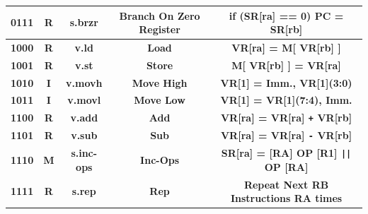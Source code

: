 \documentclass{article}
\begin{document}
\begin{table}[H]
\begin{tabular}{|c|*{4}{c|}}
        \multicolumn{1}{|c|}{\textbf{0111}}   & \multicolumn{1}{c|}{\textbf{R}}     & \multicolumn{1}{c|}{\textbf{s.brzr}}    & \multicolumn{1}{c|}{\textbf{Branch On Zero Register}} & \multicolumn{1}{c|}{\textbf{if (SR[ra] == 0) PC = SR[rb]}}              \\ \hline
        \multicolumn{1}{|c|}{\textbf{1000}}   & \multicolumn{1}{c|}{\textbf{R}}     & \multicolumn{1}{c|}{\textbf{v.ld}}      & \multicolumn{1}{c|}{\textbf{Load}}                    & \multicolumn{1}{c|}{\textbf{VR[ra] = M[ VR[rb] ]}}                      \\ \hline
        \multicolumn{1}{|c|}{\textbf{1001}}   & \multicolumn{1}{c|}{\textbf{R}}     & \multicolumn{1}{c|}{\textbf{v.st}}      & \multicolumn{1}{c|}{\textbf{Store}}                   & \multicolumn{1}{c|}{\textbf{M[ VR[rb] ] = VR[ra]}}                      \\ \hline
        \multicolumn{1}{|c|}{\textbf{1010}}   & \multicolumn{1}{c|}{\textbf{I}}     & \multicolumn{1}{c|}{\textbf{v.movh}}    & \multicolumn{1}{c|}{\textbf{Move High}}               & \multicolumn{1}{c|}{\textbf{VR[1] = {Imm., VR[1](3:0)}}}                \\ \hline
        \multicolumn{1}{|c|}{\textbf{1011}}   & \multicolumn{1}{c|}{\textbf{I}}     & \multicolumn{1}{c|}{\textbf{v.movl}}    & \multicolumn{1}{c|}{\textbf{Move Low}}                & \multicolumn{1}{c|}{\textbf{VR[1] = {VR[1](7:4), Imm.}}}                \\ \hline
        \multicolumn{1}{|c|}{\textbf{1100}}   & \multicolumn{1}{c|}{\textbf{R}}     & \multicolumn{1}{c|}{\textbf{v.add}}     & \multicolumn{1}{c|}{\textbf{Add}}                     & \multicolumn{1}{c|}{\textbf{VR[ra] = VR[ra] \texttt{+} VR[rb]}}         \\ \hline
        \multicolumn{1}{|c|}{\textbf{1101}}   & \multicolumn{1}{c|}{\textbf{R}}     & \multicolumn{1}{c|}{\textbf{v.sub}}     & \multicolumn{1}{c|}{\textbf{Sub}}                     & \multicolumn{1}{c|}{\textbf{VR[ra] = VR[ra] \texttt{-} VR[rb]}}         \\ \hline
        \multicolumn{1}{|c|}{\textbf{1110}}   & \multicolumn{1}{c|}{\textbf{M}}     & \multicolumn{1}{c|}{\textbf{s.inc-ops}} & \multicolumn{1}{c|}{\textbf{Inc-Ops}}                 & \multicolumn{1}{c|}{\textbf{SR[ra] = [RA] OP [R1] \texttt{||} OP [RA]}} \\ \hline
        \multicolumn{1}{|c|}{\textbf{1111}}   & \multicolumn{1}{c|}{\textbf{R}}     & \multicolumn{1}{c|}{\textbf{s.rep}}     & \multicolumn{1}{c|}{\textbf{Rep}}                     & \multicolumn{1}{c|}{\textbf{Repeat Next RB Instructions RA times}}      \\ \hline
      \end{tabular}
    \end{table}
\end{document}
